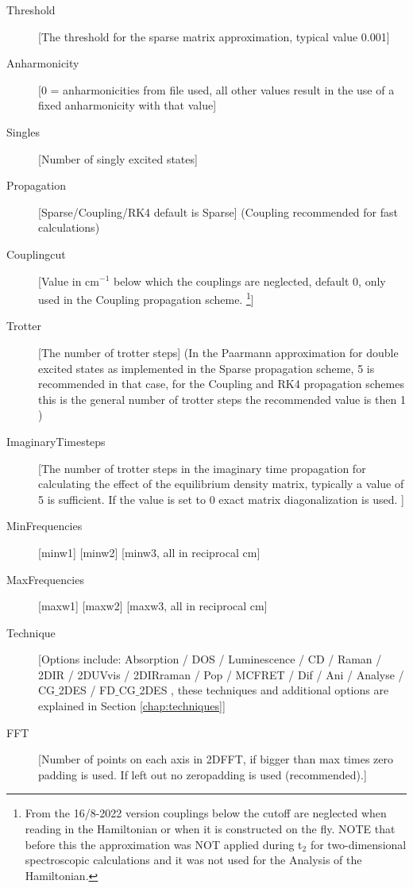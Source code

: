 \begin{description}
\item [Threshold][The threshold for the sparse matrix approximation, typical value 0.001]
\item [Anharmonicity] [0 = anharmonicities from file used, all other values result in the use of a fixed anharmonicity with that value]
\item [Singles] [Number of singly excited states]
\item [Propagation] [Sparse/Coupling/RK4 default is Sparse] (Coupling recommended for fast calculations)
\item [Couplingcut] [Value in cm$^{-1}$ below which the couplings are neglected, default 0, only used in the Coupling propagation scheme. \footnote{From the 16/8-2022 version couplings below the cutoff are neglected when reading in the Hamiltonian or when it is constructed on the fly. NOTE that before this the approximation was NOT applied during t$_2$ for two-dimensional spectroscopic calculations and it was not used for the Analysis of the Hamiltonian.}]
\item [Trotter] [The number of trotter steps] (In the Paarmann approximation for double excited 
states as implemented in the Sparse propagation scheme, 5 is recommended in that case, for the Coupling and RK4 propagation schemes this is the general number of trotter steps the recommended value is then 1 )
\item [ImaginaryTimesteps] [The number of trotter steps in the imaginary time propagation for calculating the effect of the equilibrium density matrix, typically a value of 5 is sufficient. If the value is set to 0 exact matrix diagonalization is used. ]
\item [MinFrequencies] [minw1] [minw2] [minw3, all in reciprocal cm]
\item [MaxFrequencies] [maxw1] [maxw2] [maxw3, all in reciprocal cm]
\item [Technique] [Options include: Absorption / DOS / Luminescence / CD / Raman / 2DIR / 2DUVvis / 2DIRraman / Pop / MCFRET / Dif /
 Ani / Analyse / CG$\_$2DES / FD$\_$CG$\_$2DES , these techniques and additional options are explained in Section \ref{chap:techniques}]
\item [FFT] [Number of points on each axis in 2DFFT, if bigger than max times zero padding is used. If left out no zeropadding is used (recommended).]

\end{description}
